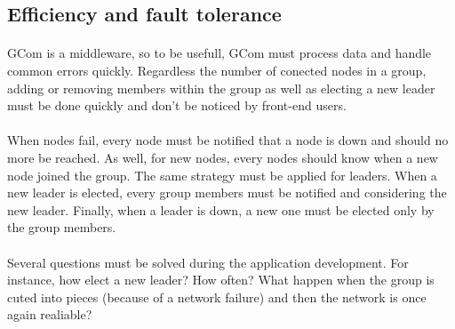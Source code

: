 \subsection{Efficiency and fault tolerance}

\paragraph{}{
	GCom is a middleware, so to be usefull, GCom must process
 data and handle common errors quickly. Regardless the number 
 of conected nodes in a group, adding or removing members within
 the group as well as electing a new leader must be done
 quickly and don't be noticed by front-end users.
}

\paragraph{}{
	When nodes fail, every node must be notified that a node
 is down and should no more be reached. As well, for new nodes,
 every nodes should know when a new node joined the group. The
 same strategy must be applied for leaders. When a new leader is
 elected, every group members must be notified and considering
 the new leader. Finally, when a leader is down, a new one must
 be elected only by the group members.
}

\paragraph{}{
	Several questions must be solved during the application
 development. For instance, how elect a new leader? How often?
 What happen when the group is cuted into pieces (because of a
 network failure) and then the network is once again realiable?
}

